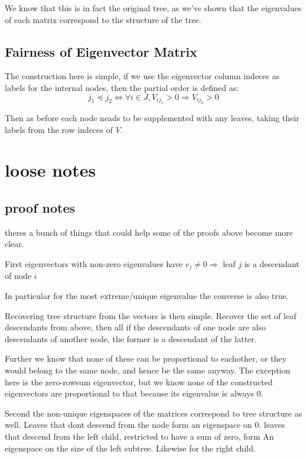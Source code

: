 \documentclass{report}
\begin{document}
We know that this is in fact the original tree, as we've shown that the
eigenvalues of each matrix correspond to the structure of the tree.

\subsection{Fairness of Eigenvector Matrix}

The construction here is simple, if we use the eigenvector column indeces as
labels for the internal nodes, then the partial order is defined as:
\[j_1 \preccurlyeq j_2 \Leftrightarrow \forall i \in J, V_{ij_1} > 0
\Rightarrow V_{ij_2} > 0 \]

Then as before each node neads to be supplemented with any leaves, taking their
labels from the row indeces of $V$.

\section{loose notes}

\subsection{proof notes}

theres a bunch of things that could help some of the proofs above become more
clear.

First eigenvectors with non-zero eigenvalues have $v_{j} \neq 0 \Rightarrow$
leaf $j$ is a descendant of node $i$

In particular for the most extreme/unique eigenvalue the converse is also true.

Recovering tree structure from the vectors is then simple.
Recover the set of leaf descendants from above, then all if the descendants of
one node are also descendants of another node, the former is a descendant of
the latter.

Further we know that none of these can be proportional to eachother, or they
would belong to the same node, and hence be the same anyway.
The exception here is the zero-rowsum eigenvector, but we know none of the
constructed eigenvectors are proportional to that because its eigenvalue is
always 0.

Second the non-unique eigenspaces of the matrices correspond to tree structure
as well.
Leaves that dont descend from the node form an eigenspace on 0.
leaves that descend from the left child, restricted to have a sum of zero, form
An eigenspace on the size of the left subtree.
Likewise for the right child.
\end{document}
